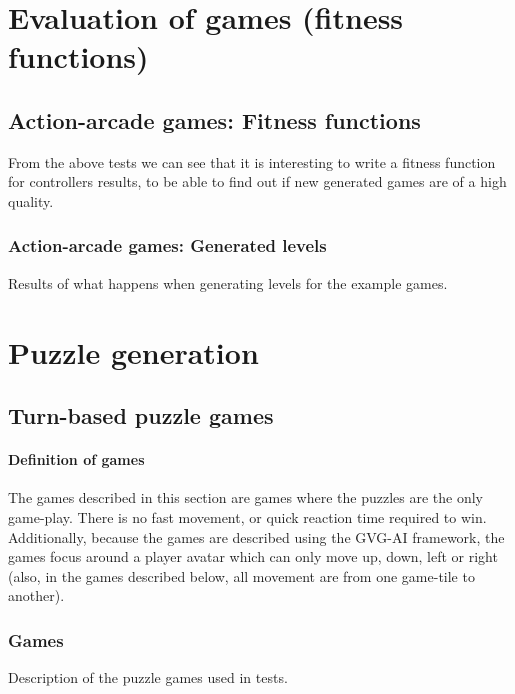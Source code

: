 \documentclass[a4paper,titlepage,final, twoside]{report}
\begin{document}
\chapter{Evaluation of games (fitness functions)}


\section{Action-arcade games: Fitness functions}
From the above tests we can see that it is interesting to write a fitness function for controllers results, to be able to find out if new generated games are of a high quality.


\subsection{Action-arcade games: Generated levels}
Results of what happens when generating levels for the example games.



\chapter{Puzzle generation}

\section{Turn-based puzzle games}

\subsubsection*{Definition of games}
The games described in this section are games where the puzzles are the only game-play. There is no fast movement, or quick reaction time required to win. Additionally, because the games are described using the GVG-AI framework, the games focus around a player avatar which can only move up, down, left or right (also, in the games described below, all movement are from one game-tile to another).

\subsection{Games} 
Description of the puzzle games used in tests. 
\end{document}
